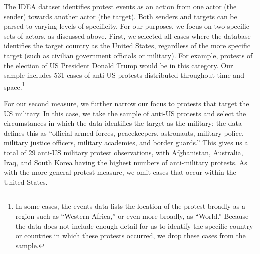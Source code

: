 		
		The IDEA dataset identifies protest events as an action from one actor (the sender) towards another actor (the target). Both senders and targets can be parsed to varying levels of specificity. For our purposes, we focus on two specific sets of actors, as discussed above. First, we selected all cases where the database identifies the target country as the United States, regardless of the more specific target (such as civilian government officials or military). For example, protests of the election of US President Donald Trump would be in this category. Our sample includes 531 cases of anti-US protests distributed throughout time and space.\footnote{In some cases, the events data lists the location of the protest broadly as a region such as ``Western Africa,'' or even more broadly, as ``World.'' Because the data does not include enough detail for us to identify the specific country or countries in which these protests occurred, we drop these cases from the sample.}
		
		For our second measure, we further narrow our focus to protests that target the US military. In this case, we take the sample of anti-US protests and select the circumstances in which the data identifies the target as the military; the data defines this as ``official armed forces, peacekeepers, astronauts, military police, military justice officers, military academies, and border guards.''\cite{Bond2003} This gives us a total of 29 anti-US military protest observations, with Afghanistan, Australia, Iraq, and South Korea having the highest numbers of anti-military protests. As with the more general protest measure, we omit cases that occur within the United States.
		
